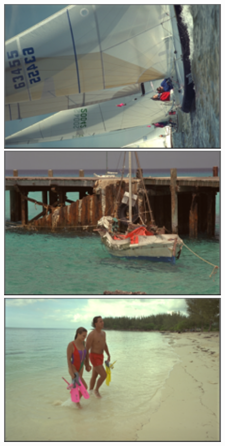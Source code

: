 \documentclass[10pt,twocolumn,letterpaper]{article}
\begin{document}
\begin{figure}
{\begin{minipage}{0.075\textwidth}
\end{minipage}
\begin{minipage}{0.075\textwidth}
\includegraphics[width=1\textwidth]{24images/resize_kodim10.png}
\end{minipage}
\begin{minipage}{0.075\textwidth}
\includegraphics[width=1\textwidth]{24images/resize_kodim11.png}
\end{minipage}
\begin{minipage}{0.075\textwidth}
\includegraphics[width=1\textwidth]{24images/resize_kodim12.png}

\end{minipage}}
\end{figure}
\end{document}
